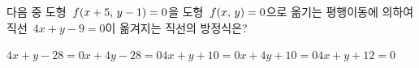 다음 중 도형~$f(x+5,\mkern3mu y-1)=0$을 도형~$f(x,\mkern3mu y)=0$으로 옮기는 평행이동에 의하여 직선~$4x+y-9=0$이 옮겨지는 직선의 방정식은?
\begin{choicesii}{$4x+y-28=0$}{$x+4y-28=0$}{$4x+y+10=0$}{$x+4y+10=0$}{$4x+y+12=0$}\end{choicesii}
